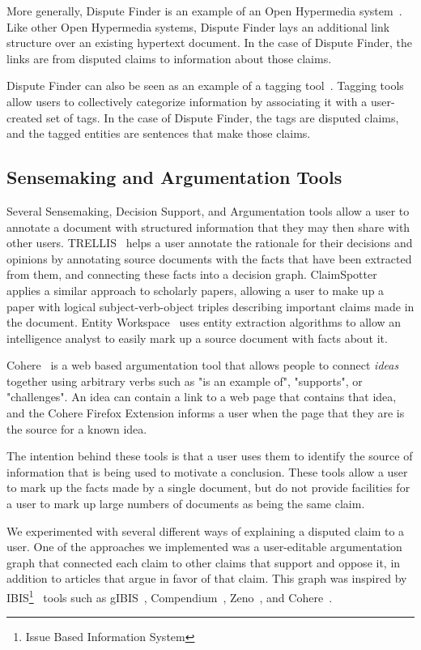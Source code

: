 \documentclass{www2010-submission}
\begin{document}
More generally, Dispute Finder is an example of an Open Hypermedia system~\cite{Bouvin2000,Wiil1996}. Like other Open Hypermedia systems, Dispute Finder lays an additional link structure over an existing hypertext document. In the case of Dispute Finder, the links are from disputed claims to information about those claims.

Dispute Finder can also be seen as an example of a tagging tool~\cite{Marlow2006,Golder2006}. Tagging tools allow users to collectively categorize information by associating it with a user-created set of tags. In the case of Dispute Finder, the tags are disputed claims, and the tagged entities are sentences that make those claims.


\subsection{Sensemaking and Argumentation Tools}

Several Sensemaking, Decision Support, and Argumentation tools allow a user to annotate a document with structured information that they may then share with other users. TRELLIS~\cite{Gil2002} helps a user annotate the rationale for their decisions and opinions by annotating source documents with the facts that have been extracted from them, and connecting these facts into a decision graph. ClaimSpotter~\cite{Sereno2005,Sereno2004} applies a similar approach to scholarly papers, allowing a user to make up a paper with logical subject-verb-object triples describing important claims made in the document. Entity Workspace~\cite{Bier2006} uses entity extraction algorithms to allow an intelligence analyst to easily mark up a source document with facts about it.

Cohere~\cite{Shum2008} is a web based argumentation tool that allows people to connect {\it ideas} together using arbitrary verbs such as "is an example of", "supports", or "challenges". An idea can contain a link to a web page that contains that idea, and the Cohere Firefox Extension informs a user when the page that they are is the source for a known idea.

The intention behind these tools is that a user uses them to identify the source of information that is being used to motivate a conclusion. These tools allow a user to mark up the facts made by a single document, but do not provide facilities for a user to mark up large numbers of documents as being the same claim. 

We experimented with several different ways of explaining a disputed claim to a user. One of the approaches we implemented was a user-editable argumentation graph that connected each claim to other claims that support and oppose it, in addition to articles that argue in favor of that claim. This graph was inspired by IBIS\footnote{Issue Based Information System}~\cite{Rittel1973} tools such as gIBIS~\cite{Conklin1987a}, Compendium~\cite{Selvin2001}, Zeno~\cite{Gordon1997}, and Cohere~\cite{Shum2008}. 
\end{document}
